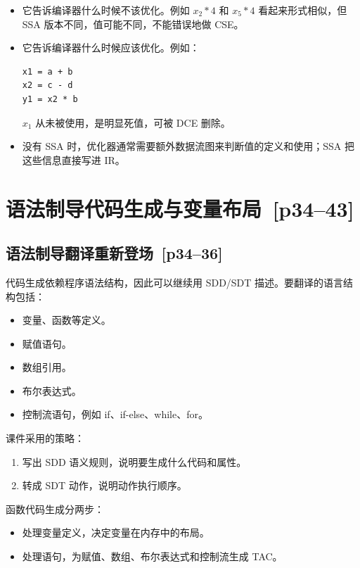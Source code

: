 \documentclass[UTF8,fontset=none,11pt]{ctexart}
\newcommand{\pg}[1]{\texorpdfstring{{\small\color{graytext}\,[p#1]}}{ [p#1]}}
\begin{document}
\begin{itemize}
  \item 它告诉编译器什么时候不该优化。例如 \(x_2*4\) 和 \(x_5*4\) 看起来形式相似，但 SSA 版本不同，值可能不同，不能错误地做 CSE。
  \item 它告诉编译器什么时候应该优化。例如：
\begin{verbatim}
x1 = a + b
x2 = c - d
y1 = x2 * b
\end{verbatim}
  \(x_1\) 从未被使用，是明显死值，可被 DCE 删除。
  \item 没有 SSA 时，优化器通常需要额外数据流图来判断值的定义和使用；SSA 把这些信息直接写进 IR。
\end{itemize}

\section{语法制导代码生成与变量布局 \pg{34--43}}

\subsection{语法制导翻译重新登场 \pg{34--36}}

代码生成依赖程序语法结构，因此可以继续用 SDD/SDT 描述。要翻译的语言结构包括：

\begin{itemize}
  \item 变量、函数等定义。
  \item 赋值语句。
  \item 数组引用。
  \item 布尔表达式。
  \item 控制流语句，例如 if、if-else、while、for。
\end{itemize}

课件采用的策略：

\begin{enumerate}
  \item 写出 SDD 语义规则，说明要生成什么代码和属性。
  \item 转成 SDT 动作，说明动作执行顺序。
\end{enumerate}

函数代码生成分两步：

\begin{itemize}
  \item 处理变量定义，决定变量在内存中的布局。
  \item 处理语句，为赋值、数组、布尔表达式和控制流生成 TAC。
\end{itemize}
\end{document}
